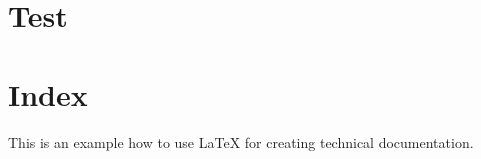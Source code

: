 \documentclass{report}
\begin{document}
\chapter{Test}	
\blindtext[5]	
\chapter{Index}
\blindtext
\par	
This is an example how to use \LaTeX {} for creating technical documentation. 
\par
\blindtext
\printindex
\end{document}
